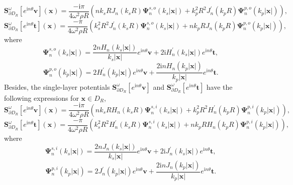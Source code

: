 \documentclass[10pt,reqno,oneside]{amsart}%
\theoremstyle{definition}
\theoremstyle{remark}
\numberwithin{equation}{section}
\numberwithin{equation}{section}
\begin{document}
$$
\mathbf{S}_{\partial D_{R}}^{\omega}\left[e^{\mathrm{i} n \theta} \boldsymbol{v}\right](\mathbf{x})=\frac{-\mathrm{i} \pi}{4 \omega^{2} \rho R}\left(n k_{s} R J_{n}\left(k_{s} R\right) \boldsymbol{\Psi}_{n}^{s, o}\left(k_{s}|\mathbf{x}|\right)+k_{p}^{2} R^{2} J_{n}^{\prime}\left(k_{p} R\right) \boldsymbol{\Psi}_{n}^{p, o}\left(k_{p}|\mathbf{x}|\right)\right),
$$
$$
\mathbf{S}_{\partial D_{R}}^{\omega}\left[e^{\mathrm{i} n \theta} \mathbf{t}\right](\mathbf{x})=\frac{-\pi}{4 \omega^{2} \rho R}\left(k_{s}^{2} R^{2} J_{n}^{\prime}\left(k_{s} R\right) \boldsymbol{\Psi}_{n}^{s, o}\left(k_{s}|\mathbf{x}|\right)+n k_{p} R J_{n}\left(k_{p} R\right) \boldsymbol{\Psi}_{n}^{p, o}\left(k_{p}|\mathbf{x}|\right)\right),
$$
where
$$
\boldsymbol{\Psi}_{n}^{s, o}\left(k_{s}|\mathbf{x}|\right)=\frac{2 n H_{n}\left(k_{s}|\mathbf{x}|\right)}{k_{s}|\mathbf{x}|} e^{\mathrm{i} n \theta} \boldsymbol{v}+2 \mathrm{i} H_{n}^{\prime}\left(k_{s}|\mathbf{x}|\right) e^{\mathrm{i} n \theta} \boldsymbol{t},
$$
$$
\boldsymbol{\Psi}_{n}^{p, o}\left(k_{p}|\mathbf{x}|\right)=2 H_{n}^{\prime}\left(k_{p}|\mathbf{x}|\right) e^{\mathrm{i} n \theta} \boldsymbol{v}+\frac{2 \mathrm{i} n H_{n}\left(k_{p}|\mathbf{x}|\right)}{k_{p}|\mathbf{x}|} e^{\mathrm{i} n \theta} \boldsymbol{t}.
$$
Besides, the single-layer potentials $\mathbf{S}_{\partial D_{R}}^{\omega}\left[e^{\mathrm{i} n \theta} \boldsymbol{v}\right]$ and $\mathbf{S}_{\partial D_{R}}^{\omega}\left[e^{\mathrm{i} n \theta} \boldsymbol{t}\right]$ have the following expressions for $\mathbf{x} \in D_{R}$,
$$
\mathbf{S}_{\partial D_{R}}^{\omega}\left[e^{\mathrm{i} n \theta} \boldsymbol{v}\right](\mathbf{x})=\frac{-\mathrm{i} \pi}{4 \omega^{2} \rho R}\left(n k_{s} R H_{n}\left(k_{s} R\right) \boldsymbol{\Psi}_{n}^{s, i}\left(k_{s}|\mathbf{x}|\right)+k_{p}^{2} R^{2} H_{n}^{\prime}\left(k_{p} R\right) \boldsymbol{\Psi}_{n}^{p, i}\left(k_{p}|\mathbf{x}|\right)\right),
$$
$$
\mathbf{S}_{\partial D_{R}}^{\omega}\left[e^{\mathrm{i} n \theta} \boldsymbol{t}\right](\mathbf{x})=\frac{-\pi}{4 \omega^{2} \rho R}\left(k_{s}^{2} R^{2} H_{n}^{\prime}\left(k_{s} R\right) \boldsymbol{\Psi}_{n}^{s, i}\left(k_{s}|\boldsymbol{x}|\right)+n k_{p} R H_{n}\left(k_{p} R\right) \boldsymbol{\Psi}_{n}^{p, i}\left(k_{p}|\boldsymbol{x}|\right)\right),
$$
where
$$
\boldsymbol{\Psi}_{n}^{s, i}\left(k_{s}|\boldsymbol{x}|\right)=\frac{2 n J_{n}\left(k_{s}|\boldsymbol{x}|\right)}{k_{s}|\boldsymbol{x}|} e^{\mathrm{i} n \theta} \boldsymbol{v}+2 \mathrm{i} J_{n}^{\prime}\left(k_{s}|\boldsymbol{x}|\right) e^{\mathrm{i} n \theta} \boldsymbol{t},
$$
$$
\boldsymbol{\Psi}_{n}^{p, i}\left(k_{p}|\boldsymbol{x}|\right)=2 J_{n}^{\prime}\left(k_{p}|\boldsymbol{x}|\right) e^{\mathrm{i} n \theta} \boldsymbol{v}+\frac{2 \mathrm{i} n J_{n}\left(k_{p}|\boldsymbol{x}|\right)}{k_{p}|\boldsymbol{x}|} e^{\mathrm{i} n \theta} \boldsymbol{t}.
$$
\end{document}
